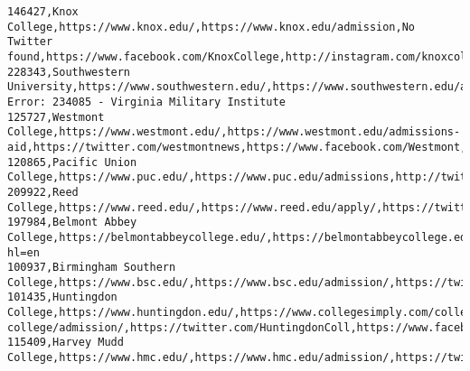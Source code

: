 \documentclass[11pt]{article}
\begin{document}
\begin{Verbatim}[commandchars=\\\{\}]
146427,Knox College,https://www.knox.edu/,https://www.knox.edu/admission,No Twitter found,https://www.facebook.com/KnoxCollege,http://instagram.com/knoxcollege1837
228343,Southwestern University,https://www.southwestern.edu/,https://www.southwestern.edu/admission/,http://twitter.com/southwesternu,http://www.facebook.com/SouthwesternUniversity,http://instagram.com/southwesternu
Error: 234085 - Virginia Military Institute
125727,Westmont College,https://www.westmont.edu/,https://www.westmont.edu/admissions-aid,https://twitter.com/westmontnews,https://www.facebook.com/Westmont,https://www.instagram.com/westmontcollege/
120865,Pacific Union College,https://www.puc.edu/,https://www.puc.edu/admissions,http://twitter.com/pucnow,https://www.facebook.com/pacificunioncollege,https://www.instagram.com/pucnow
209922,Reed College,https://www.reed.edu/,https://www.reed.edu/apply/,https://twitter.com/Reed\_College\_,https://www.facebook.com/reedcollege,https://instagram.com/reedcollege
197984,Belmont Abbey College,https://belmontabbeycollege.edu/,https://belmontabbeycollege.edu/admissions/,https://twitter.com/BelmontAbbey,https://www.facebook.com/belmontabbey/,https://www.instagram.com/belmontabbey/?hl=en
100937,Birmingham Southern College,https://www.bsc.edu/,https://www.bsc.edu/admission/,https://twitter.com/FromTheHilltop,https://www.facebook.com/43199567384/posts/10155533542147385,https://www.instagram.com/p/BmwOlGPnwS3/
101435,Huntingdon College,https://www.huntingdon.edu/,https://www.collegesimply.com/colleges/alabama/huntingdon-college/admission/,https://twitter.com/HuntingdonColl,https://www.facebook.com/HuntingdonCollege,http://instagram.com/huntingdoncollege
115409,Harvey Mudd College,https://www.hmc.edu/,https://www.hmc.edu/admission/,https://twitter.com/harveymudd,https://www.facebook.com/harveymuddcollege,https://www.instagram.com/harvey\_mudd

    \end{Verbatim}


    
    
    
    
\end{document}

